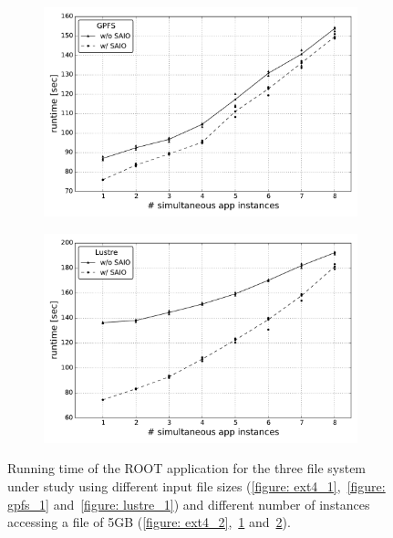\begin{figure}[!htb]
\begin{subfigure}[b]{0.32\textwidth}
    \includegraphics[width=\textwidth]{chapters/chapter2/figures/SC2015/ROOT/cluster/multiple_instances/simult_instance_gpfs_test_cluster}
    \caption{\textit{}}
    \label{figure: gpfs_2}
  \end{subfigure}
  \begin{subfigure}[b]{0.32\textwidth}
    \centering
    \includegraphics[width=\textwidth]{chapters/chapter2/figures/SC2015/ROOT/cluster/multiple_instances/multiple_simult_procs_Lustre_testcluster}
    \caption{\textit{}}
    \label{figure: lustre_2}
  \end{subfigure}
  \caption{Running time of the ROOT application for the three file system under study using different input file sizes (\ref{figure: ext4_1},~\ref{figure: gpfs_1} and~\ref{figure: lustre_1}) and different number of instances accessing a file of 5GB (\ref{figure: ext4_2},~\ref{figure: gpfs_2} and~\ref{figure: lustre_2}).}
  \label{figure: runtime}
\end{figure}

